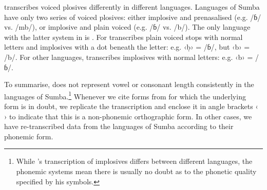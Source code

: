 \citet{Onvlee1984} transcribes voiced plosives differently in different languages.
Languages of Sumba have only two series of voiced plosives: either
implosive and prenasalised (e.g. /ɓ/ vs.
/mb/), or implosive and plain voiced (e.g. /ɓ/ vs. /b/).
The only language with the latter system in \citet{Onvlee1984} is .
For  \citeauthor{Onvlee1984} transcribes plain voiced stops with normal
letters and implosives with a dot beneath the letter: e.g.
‹ḅ› = /ɓ/, but ‹b› = /b/.
For other languages, \citet{Onvlee1984} transcribes implosives
with normal letters: e.g. ‹b› = /ɓ/.

To summarise, \citet{Onvlee1984} does not represent vowel or
consonant length consistently in the languages of Sumba.\footnote{
		While \citeauthor{Onvlee1984}’s transcription of implosives differs between
		different languages, the phonemic systems mean there is usually no doubt as to the
		phonetic quality specified by his symbols.}
Whenever we cite
forms from \citet{Onvlee1984} for which the underlying form is
in doubt, we replicate the transcription
and enclose it in angle brackets ‹ › to indicate that this is
a non-phonemic orthographic form.
In other cases, we have re-transcribed data from the languages
of Sumba according to their phonemic form.

